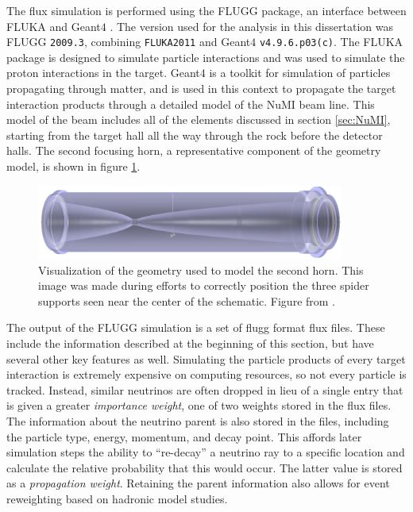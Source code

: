 The flux simulation is performed using the FLUGG package, an interface between FLUKA \cite{ref:Fluka1, ref:Fluka2} and Geant$4$ \cite{ref:Geant41, ref:Geant42}. The version used for the analysis in this dissertation was FLUGG \verb|2009.3|, combining \verb|FLUKA2011| and Geant$4$ \verb|v4.9.6.p03(c)|. The FLUKA package is designed to simulate particle interactions and was used to simulate the proton interactions in the target. Geant$4$ is a toolkit for simulation of particles propagating through matter, and is used in this context to propagate the target interaction products through a detailed model of the NuMI beam line. This model of the beam includes all of the elements discussed in section \ref{sec:NuMI}, starting from the target hall all the way through the rock before the detector halls. The second focusing horn, a representative component of the geometry model, is shown in figure \ref{fig:GeomHorn}.
\begin{figure}[htb]
  \centering
  \includegraphics[width=0.9\textwidth]{figures/Horn2.png}
  \caption[Model of the Second Focusing Horn]{Visualization of the geometry used to model the second horn. This image was made during efforts to correctly position the three spider supports seen near the center of the schematic. Figure from \cite{ref:GeomNuMI}.}
  \label{fig:GeomHorn}
\end{figure}

The output of the FLUGG simulation is a set of flugg format flux files. These include the information described at the beginning of this section, but have several other key features as well. Simulating the particle products of every target interaction is extremely expensive on computing resources, so not every particle is tracked. Instead, similar neutrinos are often dropped in lieu of a single entry that is given a greater {\em importance weight}, one of two weights stored in the flux files. The information about the neutrino parent is also stored in the files, including the particle type, energy, momentum, and decay point. This affords later simulation steps the ability to ``re-decay'' a neutrino ray to a specific location and calculate the relative probability that this would occur. The latter value is stored as a {\em propagation weight}. Retaining the parent information also allows for event reweighting based on hadronic model studies.

